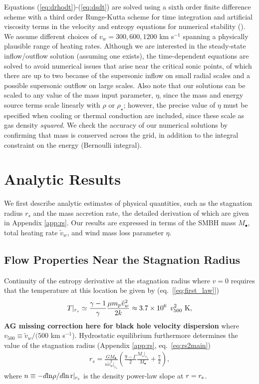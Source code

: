 \documentclass[usenatbib,fleqn]{mn2e}
\newcommand{\rs}{r_s}
\newcommand{\vw}{\tilde{v}_{w}}
\newcommand{\Mbh}[1][]{M_{\bullet#1}}
\begin{document}
Equations (\ref{eq:drhodt})-(\ref{eq:dsdt}) are solved using a sixth
order finite difference scheme with a third order Runge-Kutta scheme
for time integration and artificial viscosity terms in the velocity
and entropy equations for numerical stability
(\citealt{Brandenburg:2003a}).  We assume different
choices of $v_{w} = 300, 600, 1200$ km s$^{-1}$ spanning a
physically plausible range of heating rates.  Although we are interested in the steady-state inflow/outflow solution (assuming one exists), the time-dependent equations are solved to avoid numerical issues that arise near the critical sonic points, of which there are up to two because of the supersonic
inflow on small radial scales and a possible supersonic outflow on large scales.  Also note that our solutions can be scaled to any value of the mass input parameter, $\eta$, since the mass and energy source terms scale linearly with $\rho$ or $\rho_{\star}$; however, the precise value of $\eta$ must be specified when cooling or thermal conduction are included, since these scale as gas density {\it squared}.  We check the accuracy of our numerical solutions by confirming that mass is conserved across the grid, in addition to the integral constraint on the energy (Bernoulli integral). 



\section{Analytic Results}
\label{sec:results}

We first describe analytic estimates of physical quantities, such as the stagnation radius $\rs$ and the mass accretion rate, the detailed derivation of which are given in Appendix \ref{app:rs}.  Our results are expressed in terms of the SMBH mass $M_{\bullet}$, total heating rate $\tilde{v}_{w}$, and wind mass loss parameter $\eta$.

\subsection{Flow Properties Near the Stagnation Radius}

Continuity of the entropy derivative at the stagnation radius where $v = 0$ requires that the temperature at this location be given by (eq.~[\ref{eq:first_law}])
\begin{align}
T|_{r_{s}} \simeq \frac{\gamma-1}{\gamma}\frac{\mu m_p \tilde{v}_{w}^{2}}{2k} \approx 3.7
\times 10^6\ \, v_{500}^2 \,\,{\rm K},
\label{eq:Tanalytic}
\end{align}
{\bf AG missing correction here for black hole velocity dispersion}
where $v_{500} \equiv \tilde{v}_{w}/(500$ km s$^{-1}$).  Hydrostatic equilibrium furthermore determines the value of the stagnation radius (Appendix \ref{app:rs}, eq.~\ref{eq:rs2main})
\begin{align}
\rs=\frac{G \Mbh}{n \vw^{2}|_{\rs}}\left(\frac{9-\Gamma}{2} \frac{M_{\star}|_{\rs}}{\Mbh} +\frac{7}{2}\right),
\label{eq:stag_analytic}
\end{align}
where $n \equiv -d{\rm ln}\rho/d{\rm ln\,r}|_{r_{\rm s}}$ is the density power-law slope at $r = r_{\rm s}$.  
\end{document}
